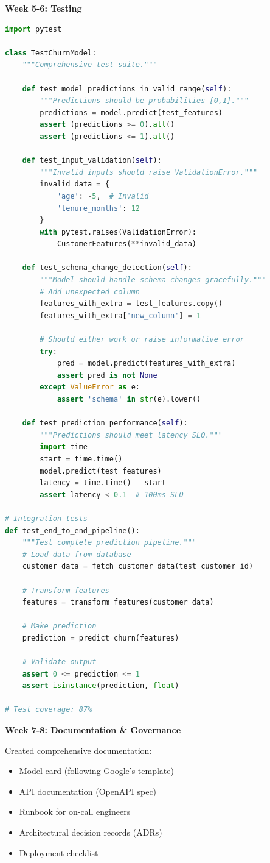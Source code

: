 \textbf{Week 5-6: Testing}
\begin{lstlisting}[language=Python]
import pytest

class TestChurnModel:
    """Comprehensive test suite."""

    def test_model_predictions_in_valid_range(self):
        """Predictions should be probabilities [0,1]."""
        predictions = model.predict(test_features)
        assert (predictions >= 0).all()
        assert (predictions <= 1).all()

    def test_input_validation(self):
        """Invalid inputs should raise ValidationError."""
        invalid_data = {
            'age': -5,  # Invalid
            'tenure_months': 12
        }
        with pytest.raises(ValidationError):
            CustomerFeatures(**invalid_data)

    def test_schema_change_detection(self):
        """Model should handle schema changes gracefully."""
        # Add unexpected column
        features_with_extra = test_features.copy()
        features_with_extra['new_column'] = 1

        # Should either work or raise informative error
        try:
            pred = model.predict(features_with_extra)
            assert pred is not None
        except ValueError as e:
            assert 'schema' in str(e).lower()

    def test_prediction_performance(self):
        """Predictions should meet latency SLO."""
        import time
        start = time.time()
        model.predict(test_features)
        latency = time.time() - start
        assert latency < 0.1  # 100ms SLO

# Integration tests
def test_end_to_end_pipeline():
    """Test complete prediction pipeline."""
    # Load data from database
    customer_data = fetch_customer_data(test_customer_id)

    # Transform features
    features = transform_features(customer_data)

    # Make prediction
    prediction = predict_churn(features)

    # Validate output
    assert 0 <= prediction <= 1
    assert isinstance(prediction, float)

# Test coverage: 87%
\end{lstlisting}

\textbf{Week 7-8: Documentation \& Governance}

Created comprehensive documentation:
\begin{itemize}
    \item Model card (following Google's template)
    \item API documentation (OpenAPI spec)
    \item Runbook for on-call engineers
    \item Architectural decision records (ADRs)
    \item Deployment checklist
\end{itemize}

